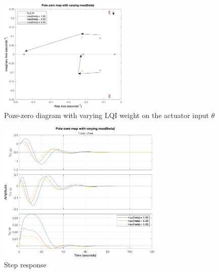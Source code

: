 \begin{figure}[ht]
	\centering
	\includegraphics[width=0.55\textwidth]{Graphics/LQI pole zero/05_pzmap_theta.png}
	\caption{Poze-zero diagram with varying LQI weight on the actuator input $ \theta $}
	\label{fig:pzmap_theta}
\end{figure}

\begin{figure}[ht]
	\centering
	\includegraphics[width=0.7\textwidth]{Graphics/LQI pole zero/105_step_theta.png}
	\caption{Step response}
	\label{fig:step_theta}
\end{figure}

%	
%	
